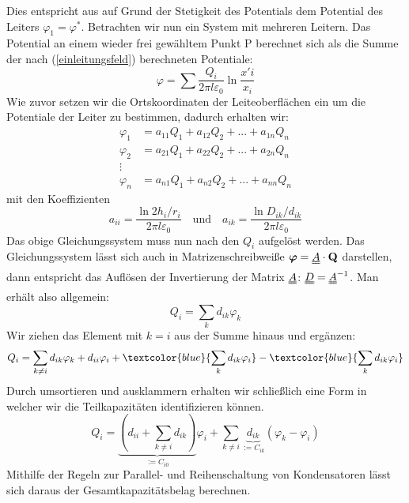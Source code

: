 \documentclass[10pt,a4paper]{article}
\begin{document}
Dies entspricht aus auf Grund der Stetigkeit des Potentials %
dem Potential des Leiters $\varphi_1 = \varphi^*$.
Betrachten wir nun ein System mit mehreren Leitern. Das Potential an einem wieder frei gewähltem Punkt P berechnet sich als die Summe der nach (\ref{einleitungsfeld}) berechneten Potentiale:
\begin{equation}
\varphi = \sum \frac{Q_i}{2\pi l\varepsilon_0} \ln \frac{x'i}{x_i}
\end{equation}
Wie zuvor setzen wir die Ortskoordinaten der Leiteoberflächen ein um die Potentiale der Leiter zu bestimmen, dadurch erhalten wir:
\begin{align}
\varphi_1 &= a_{11} Q_1 + a_{12} Q_{2} + ... + a_{1n} Q_n \\
\varphi_2 &= a_{21} Q_1 + a_{22} Q_{2} + ... + a_{2n} Q_n \\
\vdots \\
\varphi_n &= a_{n1} Q_1 + a_{n2} Q_{2} + ... + a_{nn} Q_n
\end{align}
mit den Koeffizienten
\begin{equation}
a_{ii} = \frac{\ln 2h_i/r_i}{2\pi l \varepsilon_0} \quad \textrm{und} \quad a_{ik} = \frac{\ln D_{ik}/d_{ik}}{2\pi l \varepsilon_0}
\end{equation}
Das obige Gleichungssystem muss nun nach den $Q_i$ aufgelöst werden. Das Gleichungssystem lässt sich auch in Matrizenschreibweiße $\boldsymbol{\varphi} = \uuline{A} \cdot \mathbf{Q}$ darstellen, dann entspricht das Auflösen der Invertierung der Matrix $\uuline{A}$: $\uuline{D}=\uuline{A}^{-1}$. Man erhält also allgemein:
\begin{equation}
Q_i = \sum_k d_{ik}\varphi_k
\end{equation}
Wir ziehen das Element mit $k=i$ aus der Summe hinaus und ergänzen:
\begin{equation}
Q_i = \sum_{k\neq i} d_{ik}\varphi_k + d_{ii}\varphi_i + \textcolor{blue}{\sum_k d_{ik}\varphi_i} - \textcolor{blue}
{\sum_k d_{ik}\varphi_i}
\end{equation}
Durch umsortieren und ausklammern erhalten wir schließlich eine Form in welcher wir die Teilkapazitäten identifizieren können.
\begin{equation}
Q_i = \underbrace{\left(d_{ii}+\sum_{k\neq i}d_{ik}\right)}_{:=C_{i0}}\varphi_i + \sum_{k\neq i} \underbrace{d_{ik}}_{:=C_{ik}} \left( \varphi_k - \varphi_i \right)
\end{equation}
Mithilfe der Regeln zur Parallel- und Reihenschaltung von Kondensatoren lässt sich daraus der Gesamtkapazitätsbelag berechnen.
\end{document}
